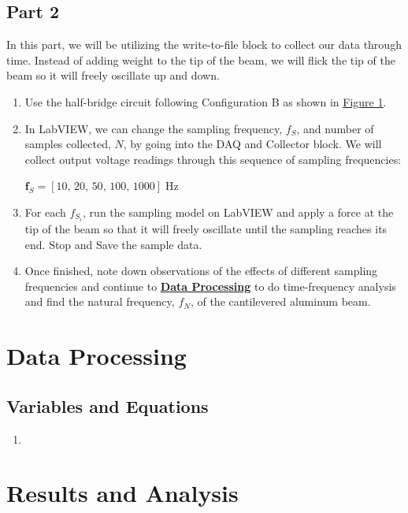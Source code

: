 \documentclass{article}
\begin{document}
\subsection{Part 2}
In this part, we will be utilizing the write-to-file block to collect our data through time. Instead of adding weight to the tip of the beam, we will flick the tip of the beam so it will freely oscillate up and down.

\begin{enumerate}
    \item Use the half-bridge circuit following Configuration B as shown in \hyperlink{fig1}{Figure 1}. 
    \item In LabVIEW, we can change the sampling frequency, $f_{S}$, and number of samples collected, $N$, by going into the DAQ and Collector block. We will collect output voltage readings through this sequence of sampling frequencies:
    \vspace{0.5mm}

    \(\textbf{f}_{S} = \left[10,\, 20,\, 50,\, 100,\, 1000\right]\; \text{Hz}\)

    \item For each $f_{S_{i}}$, run the sampling model on LabVIEW and apply a force at the tip of the beam so that it will freely oscillate until the sampling reaches its end. Stop and Save the sample data.

    \item Once finished, note down observations of the effects of different sampling frequencies and continue to \hyperlink{datapro}{\textbf{Data Processing}} to do time-frequency analysis and find the natural frequency, $f_{N}$, of the cantilevered aluminum beam.
\end{enumerate}

\hypertarget{datapro}{}
\section{Data Processing}
\subsection{Variables and Equations}
\begin{enumerate}[label = \Roman*.]
    \item 
\end{enumerate}
\section{Results and Analysis}
\end{document}
